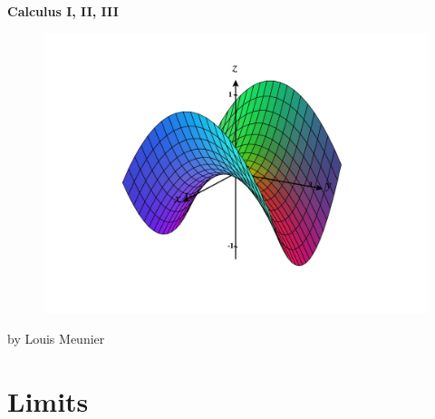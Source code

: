 \documentclass[12pt]{article}
\begin{document}
\newcommand{\red}[1]{\textcolor{red}{#1}}
\newcommand{\ddx}{\frac{d}{dx}}
\newcommand{\ddy}{\frac{d}{dy}}
\newcommand{\dxdy}{\frac{dx}{dy}}
\newcommand{\dydx}{\frac{dy}{dx}}

\newcommand{\real}{\mathbb{R}}
\newcommand{\naturals}{\mathbb{N}}
\newcommand{\integers}{\mathbb{Z}}
\newcommand{\rational}{\mathbb{Q}}
\newcommand{\complex}{\mathbb{C}}


\begin{titlepage}
    \begin{center}
        \vspace*{1cm}
        \Huge
        \textbf{Calculus I, II, III}
        
        \vfill
        
        \begin{figure}[!ht]
            \centering
            \includegraphics[width=17cm]{misc/saddle.png}
        \end{figure}
        \vfill
        
        \small
        by Louis Meunier
        
        \href{https://notes.louismeunier.net}{\color{violet}{notes.louismeunier.net}}
        
    \end{center}
\end{titlepage}

{
  \hypersetup{linkcolor=violet}
  \tableofcontents
}

\newpage
\pagestyle{mypage}
\section{Limits}
\end{document}
